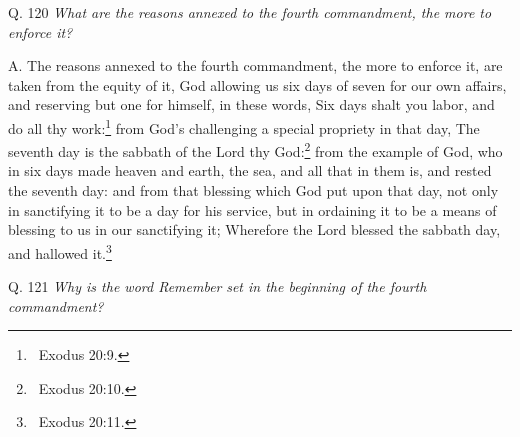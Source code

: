 {{{{{{{{{{{{{{{\bigskip

Q. 120 \textit{What are the reasons annexed to the fourth commandment}\textit{, the more to enforce it}\textit{?}

A. The reasons annexed to the fourth commandment, the more to enforce
it, are taken from the equity of it, God allowing us
six days of seven for our own affairs, and reserving
but one for himself, in these words, Six days shalt you labor, and do all thy
work:\footnote{\ Exodus 20:9.} from God's challenging a special propriety
in that day, The seventh day is the
sabbath of the Lord thy God:\footnote{\ Exodus 20:10.} from the example of God, who in six days made
heaven and earth, the sea, and all that in them is, and rested the seventh day: and
from that blessing which God put upon that day, not only in sanctifying it to be a day
for his service, but in ordaining it to be a means of blessing to us in our sanctifying it; Wherefore the Lord blessed
the sabbath day, and hallowed it.\footnote{\ Exodus
20:11.}


\bigskip

Q. 121 \textit{Why is the word Remember}\textit{ set in the beginning of the
fourth commandment}\textit{?}

}}}}}}}}}}}}}}}
